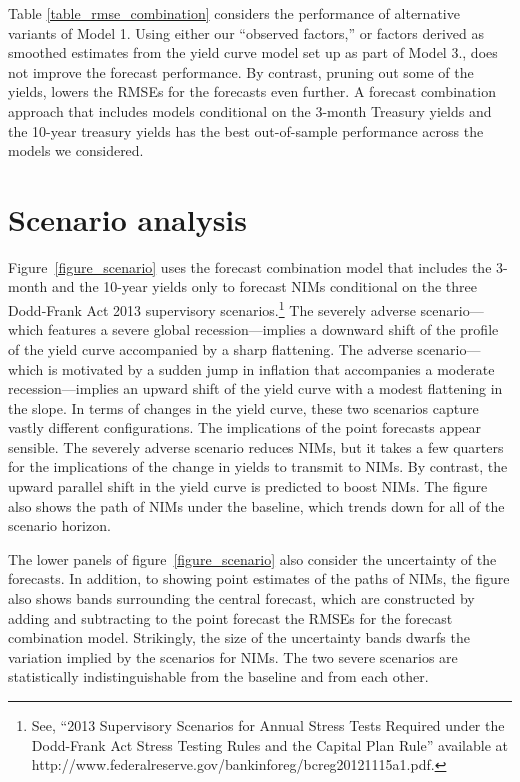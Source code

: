 \documentclass[11pt]{article}
\renewcommand{\baselinestretch}{1.5}
\begin{document}
Table \ref{table_rmse_combination} considers the performance of alternative variants of Model 1. Using either our ``observed factors,'' or factors derived as smoothed estimates from the yield curve model set up as part of Model 3., does not improve the forecast performance.  By contrast, pruning out some of the yields, lowers the RMSEs for the forecasts even further. A forecast combination approach that includes models conditional on the 3-month Treasury yields and the 10-year treasury yields has the best out-of-sample performance across the models we considered. 

\section{Scenario analysis}

Figure~\ref{figure_scenario} uses the forecast combination model that includes the 3-month and the 10-year yields only to forecast NIMs conditional on the three Dodd-Frank Act 2013 supervisory scenarios.\renewcommand{\baselinestretch}{1.0}\footnote{See, ``2013 Supervisory Scenarios for Annual Stress Tests Required under the Dodd-Frank Act Stress Testing Rules and the Capital Plan Rule'' available at http://www.federalreserve.gov/bankinforeg/bcreg20121115a1.pdf.\vspace{0.05in}}\renewcommand{\baselinestretch}{1.5}    The severely adverse scenario---which features a severe global recession---implies a downward shift of the profile of the yield curve accompanied by a sharp flattening. The adverse scenario---which is motivated by a sudden jump in inflation that accompanies a moderate recession---implies an upward shift of the yield curve with a modest flattening in the slope. In terms of changes in the yield curve, these two scenarios capture vastly different configurations.  The implications of the point forecasts appear sensible. The severely adverse scenario reduces NIMs, but it takes a few quarters for the implications of the change in yields to transmit to NIMs. By contrast, the upward parallel shift in the yield curve is predicted to boost NIMs.  The figure also shows the path of NIMs under the baseline, which trends down for all of the scenario horizon.

The lower panels of figure~\ref{figure_scenario} also consider the uncertainty of the forecasts.  In addition, to showing point estimates of the paths of NIMs, the figure also shows bands surrounding the central forecast, which are constructed by adding and subtracting to the point forecast the RMSEs for the forecast combination model. Strikingly, the size of the uncertainty bands dwarfs the variation implied by the scenarios for NIMs. The two severe scenarios are statistically indistinguishable from the baseline and from each other.
\end{document}
